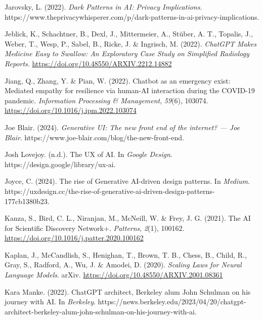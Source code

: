 \documentclass[
  letterpaper,
  DIV=11,
  numbers=noendperiod]{scrartcl}
\newlength{\cslhangindent}
\newenvironment{CSLReferences}[2] %
 {\begin{list}{}{%
  \setlength{\itemindent}{0pt}
  \setlength{\leftmargin}{0pt}
  \setlength{\parsep}{0pt}
  \ifodd #1
   \setlength{\leftmargin}{\cslhangindent}
   \setlength{\itemindent}{-1\cslhangindent}
  \fi
  \setlength{\itemsep}{#2\baselineskip}}}
 {\end{list}}
\begin{document}
\begin{CSLReferences}{1}{0}
Jarovsky, L. (2022). \emph{Dark {Patterns} in {AI}: {Privacy
Implications}}.
https://www.theprivacywhisperer.com/p/dark-patterns-in-ai-privacy-implications.

Jeblick, K., Schachtner, B., Dexl, J., Mittermeier, A., Stüber, A. T.,
Topalis, J., Weber, T., Wesp, P., Sabel, B., Ricke, J. \& Ingrisch, M.
(2022). \emph{{ChatGPT Makes Medicine Easy} to {Swallow}: {An
Exploratory Case Study} on {Simplified Radiology Reports}}.
\url{https://doi.org/10.48550/ARXIV.2212.14882}

Jiang, Q., Zhang, Y. \& Pian, W. (2022). Chatbot as an emergency exist:
{Mediated} empathy for resilience via human-{AI} interaction during the
{COVID-19} pandemic. \emph{Information Processing \& Management},
\emph{59}(6), 103074. \url{https://doi.org/10.1016/j.ipm.2022.103074}

Joe Blair. (2024). \emph{Generative {UI}: The new front end of the
internet? --- {Joe Blair}}.
https://www.joe-blair.com/blog/the-new-front-end.

Josh Lovejoy. (n.d.). The {UX} of {AI}. In \emph{Google Design}.
https://design.google/library/ux-ai.

Joyce, C. (2024). The rise of {Generative AI-driven} design patterns. In
\emph{Medium}.
https://uxdesign.cc/the-rise-of-generative-ai-driven-design-patterns-177cb1380b23.

Kanza, S., Bird, C. L., Niranjan, M., McNeill, W. \& Frey, J. G. (2021).
The {AI} for {Scientific Discovery Network}+. \emph{Patterns},
\emph{2}(1), 100162. \url{https://doi.org/10.1016/j.patter.2020.100162}

Kaplan, J., McCandlish, S., Henighan, T., Brown, T. B., Chess, B.,
Child, R., Gray, S., Radford, A., Wu, J. \& Amodei, D. (2020).
\emph{Scaling {Laws} for {Neural Language Models}}. arXiv.
\url{https://doi.org/10.48550/ARXIV.2001.08361}

Kara Manke. (2022). {ChatGPT} architect, {Berkeley} alum {John Schulman}
on his journey with {AI}. In \emph{Berkeley}.
https://news.berkeley.edu/2023/04/20/chatgpt-architect-berkeley-alum-john-schulman-on-his-journey-with-ai.


\end{CSLReferences}
\end{document}
